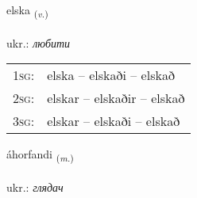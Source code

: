 \documentclass[frontgrid, backgrid]{flacards}\usepackage[]{graphicx}\usepackage[]{xcolor}
\begin{document}
\renewcommand{\blhead}{\vskip5pt {\small\bfseries\footnotesize Sagnorð | дієслово }}
\renewcommand{\bcfoot}{\vskip5pt \hspace{2pt}{\small\bfseries\footnotesize 2K}}


{elska \small{\textsubscript{(\textit{v.})}} \\[1ex] %
\textphonetic{[ɛlska]} \\
ukr.: \emph{любити} \\  [2ex]
\renewcommand*{\arraystretch}{0.8}
\begin{tabular}{p{1cm}l}
\textsc{1sg}: & elska -- elskaði -- elskað \\ 
\textsc{2sg}: & elskar -- elskaðir -- elskað \\ 
\textsc{3sg}: & elskar -- elskaði -- elskað \\ 
\end{tabular}
}

\renewcommand{\flhead}{\vskip5pt \fboxsep=0pt {\small\bfseries\footnotesize Nafnorð | іменник}}
\renewcommand{\fcfoot}{\vskip5pt \fboxsep=0pt \hspace{2pt}{\small\bfseries\footnotesize 2K}}

\renewcommand{\blhead}{\vskip5pt {\small\bfseries\footnotesize Nafnorð | іменник }}
\renewcommand{\bcfoot}{\vskip5pt \hspace{2pt}{\small\bfseries\footnotesize 2K}}


{áhorfandi \small{\textsubscript{(\textit{m.})}} \\[1ex] %
\textphonetic{[auːhɔrvantɪ]} \\
ukr.: \emph{глядач} \\  [2ex]
\renewcommand*{\arraystretch}{0.8}
}
\end{document}
